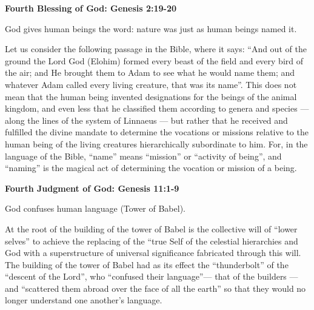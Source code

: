 \textbf{Fourth Blessing of God: Genesis 2:19-20}

God gives human beings the word: nature was just as human beings named it.

\begin{quotex}
Let us consider the following passage in the Bible, where it says: ``And out of the ground the Lord God (Elohim) formed every beast of the field and every bird of the air; and He brought them to Adam to see what he would name them; and whatever Adam called every living creature, that was its name''. This does not mean that the human being invented designations for the beings of the animal kingdom, and even less that he classified them according to genera and species — along the lines of the system of Linnaeus — but rather that he received and fulfilled the divine mandate to determine the vocations or missions relative to the human being of the living creatures hierarchically subordinate to him. For, in the language of the Bible, ``name'' means ``mission'' or ``activity of being'', and ``naming'' is the magical act of determining the vocation or mission of a being. 

\end{quotex}
\textbf{Fourth Judgment of God: Genesis 11:1-9}

God confuses human language (Tower of Babel).

\begin{quotex}
At the root of the building of the tower of Babel is the collective will of ``lower selves'' to achieve the replacing of the ``true Self of the celestial hierarchies and God with a superstructure of universal significance fabricated through this will. The building of the tower of Babel had as its effect the ``thunderbolt'' of the ``descent of the Lord'', who ``confused their language''— that of the builders —and ``scattered them abroad over the face of all the earth'' so that they would no longer understand one another's language.

\end{quotex}

